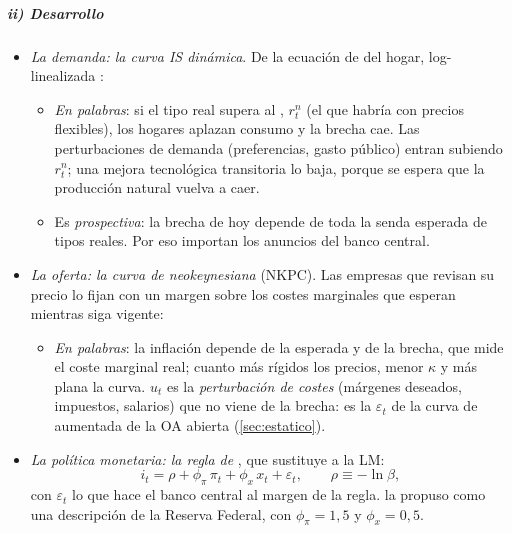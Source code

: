 \documentclass[11pt]{article}
\begin{document}
\subparagraph{ii) Desarrollo}

\begin{itemize}
\item \emph{La demanda: la curva IS dinámica}. De la ecuación de  del hogar, log-linealizada :
  \begin{itemize}
  \item \emph{En palabras}: si el tipo real supera al , $r^n_t$ (el que habría con precios flexibles), los hogares aplazan consumo y la brecha cae. Las perturbaciones de demanda (preferencias, gasto público) entran subiendo $r^n_t$; una mejora tecnológica transitoria lo baja, porque se espera que la producción natural vuelva a caer.
  \item Es \emph{prospectiva}: la brecha de hoy depende de toda la senda esperada de tipos reales. Por eso importan los anuncios del banco central.
  \end{itemize}
\item \emph{La oferta: la curva de  neokeynesiana} (NKPC). Las empresas que revisan su precio lo fijan con un margen sobre los costes marginales que esperan mientras siga vigente:
  \begin{itemize}
  \item \emph{En palabras}: la inflación depende de la esperada y de la brecha, que mide el coste marginal real; cuanto más rígidos los precios, menor $\kappa$ y más plana la curva. $u_t$ es la \emph{perturbación de costes} (márgenes deseados, impuestos, salarios) que no viene de la brecha: es la $\varepsilon_t$ de la curva de  aumentada de la OA abierta (\ref{sec:estatico}).
  \end{itemize}
\item \emph{La política monetaria: la regla de } , que sustituye a la LM:
  \begin{equation}
  i_t=\rho+\phi_\pi\,\pi_t+\phi_x\,x_t+\varepsilon_t,\qquad \rho\equiv-\ln\beta, \label{eq:taylor}
  \end{equation}
  con $\varepsilon_t$ lo que hace el banco central al margen de la regla. \textcite{Taylor1993} la propuso como una descripción de la Reserva Federal, con $\phi_\pi=1{,}5$ y $\phi_x=0{,}5$.

\end{itemize}
\end{document}
